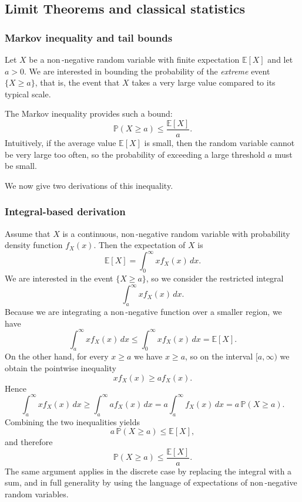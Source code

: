 
\subsection{Limit Theorems and classical statistics}

\subsubsection{Markov inequality and tail bounds}

Let \(X\) be a non\,-negative random variable with finite expectation \(\mathbb{E}[X]\) and let \(a > 0\).  
We are interested in bounding the probability of the \textit{extreme} event \(\{X \ge a\}\), that is, the event that \(X\) takes a very large value compared to its typical scale.  

The Markov inequality provides such a bound:
\[
\mathbb{P}(X \ge a) \le \frac{\mathbb{E}[X]}{a}.
\]
Intuitively, if the average value \(\mathbb{E}[X]\) is small, then the random variable cannot be very large too often, so the probability of exceeding a large threshold \(a\) must be small.  

We now give two derivations of this inequality.

\subsubsection{Integral-based derivation}

Assume that \(X\) is a continuous, non\,-negative random variable with probability density function \(f_X(x)\).  
Then the expectation of \(X\) is
\[
\mathbb{E}[X] = \int_{0}^{\infty} x f_X(x) \, dx.
\]
We are interested in the event \(\{X \ge a\}\), so we consider the restricted integral
\[
\int_{a}^{\infty} x f_X(x) \, dx.
\]
Because we are integrating a non\,-negative function over a smaller region, we have
\[
\int_{a}^{\infty} x f_X(x) \, dx \le \int_{0}^{\infty} x f_X(x) \, dx = \mathbb{E}[X].
\]
On the other hand, for every \(x \ge a\) we have \(x \ge a\), so on the interval \([a,\infty)\) we obtain the pointwise inequality
\[
x f_X(x) \ge a f_X(x).
\]
Hence
\[
\int_{a}^{\infty} x f_X(x) \, dx
\ge
\int_{a}^{\infty} a f_X(x) \, dx
=
a \int_{a}^{\infty} f_X(x) \, dx
=
a \,\mathbb{P}(X \ge a).
\]
Combining the two inequalities yields
\[
a \,\mathbb{P}(X \ge a)
\le
\mathbb{E}[X],
\]
and therefore
\[
\mathbb{P}(X \ge a) \le \frac{\mathbb{E}[X]}{a}.
\]
The same argument applies in the discrete case by replacing the integral with a sum, and in full generality by using the language of expectations of non\,-negative random variables.

